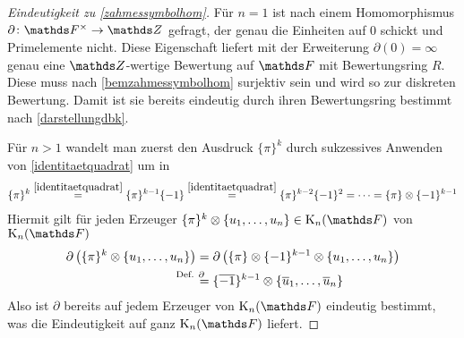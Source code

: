 \documentclass[ngerman,fontsize=11pt, paper=a4, parskip=half, titlepage=true, toc=bib]{scrartcl}
\begin{document}
\begin{proof}[Eindeutigkeit zu \ref{zahmessymbolhom}]
  Für $n=1$ ist nach einem Homomorphismus $\partial\colon \Fx\to\Z$
  gefragt, der genau die Einheiten auf $0$ schickt und Primelemente nicht.
  Diese Eigenschaft liefert mit der Erweiterung $\partial(0)=\infty$
  genau eine $\Z$-wertige Bewertung auf $\F$ mit Bewertungsring
  $R$. Diese muss nach \ref{bemzahmessymbolhom} surjektiv sein
  und wird so zur diskreten Bewertung.
  Damit ist sie bereits eindeutig durch ihren Bewertungsring bestimmt 
  nach \ref{darstellungdbk}.

  Für $n>1$ wandelt man zuerst den Ausdruck $\{\pi\}^k$ durch
  sukzessives Anwenden von \ref{identitaetquadrat} um in
  \begin{gather*}
    \{\pi\}^k
    \overset{\ref{identitaetquadrat}}{=} \{\pi\}^{k-1}\{-1\}
    \overset{\ref{identitaetquadrat}}{=} \{\pi\}^{k-2}\{-1\}^2
    =\dotsb=\{\pi\}\otimes\{-1\}^{k-1}
  \end{gather*}
  Hiermit gilt für jeden Erzeuger
  $\{\pi\}^k\otimes\{u_1,\dotsc,u_n\}\in\KnF$ von $\KnF$
  \begin{align*}
    \partial\left(\{\pi\}^k\otimes\{u_1,\dotsc,u_n\}\right)
    &= \partial\left(
      \{\pi\}\otimes\{-1\}^{k-1}\otimes\{u_1,\dotsc,u_n\}
      \right)\\
    &\overset{\mathllap{\text{Def. $\partial$}}}{=}
    \{\ov {-1}\}^{k-1}\otimes\{\ov u_1,\dotsc,\ov u_n\}
  \end{align*}
  Also ist $\partial$ bereits auf jedem Erzeuger von $\KnF$ eindeutig
  bestimmt, was die Eindeutigkeit auf ganz $\KnF$ liefert.
\end{proof}
\end{document}
